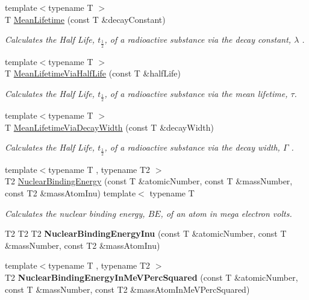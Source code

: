 \begin{DoxyCompactItemize}
{\footnotesize template$<$typename T $>$ }\\T \hyperlink{group___atomic_gaa9e3c2deedda4bc7a745568b06fc47eb}{Mean\+Lifetime} (const T \&decay\+Constant)
\begin{DoxyCompactList}\small\item\em Calculates the Half Life, $t_{\frac{1}{2}}$, of a radioactive substance via the decay constant, $\lambda$ . \end{DoxyCompactList}\item 
{\footnotesize template$<$typename T $>$ }\\T \hyperlink{group___atomic_ga2586e148263e1f6c8ff89f269a0930ea}{Mean\+Lifetime\+Via\+Half\+Life} (const T \&half\+Life)
\begin{DoxyCompactList}\small\item\em Calculates the Half Life, $t_{\frac{1}{2}}$, of a radioactive substance via the mean lifetime, $\tau$. \end{DoxyCompactList}\item 
{\footnotesize template$<$typename T $>$ }\\T \hyperlink{group___atomic_ga8a1dda4168b4b25db93bf1ae7832fd7e}{Mean\+Lifetime\+Via\+Decay\+Width} (const T \&decay\+Width)
\begin{DoxyCompactList}\small\item\em Calculates the Half Life, $t_{\frac{1}{2}}$, of a radioactive substance via the decay width, $\Gamma$ . \end{DoxyCompactList}\item 
{\footnotesize template$<$typename T , typename T2 $>$ }\\T2 \hyperlink{group___nuclear_binding_energy_gafea41a3c21704414394c3204b35aba98}{Nuclear\+Binding\+Energy} (const T \&atomic\+Number, const T \&mass\+Number, const T2 \&mass\+Atom\+Inu) template$<$ typename T
\begin{DoxyCompactList}\small\item\em Calculates the nuclear binding energy, $BE$, of an atom in mega electron volts. \end{DoxyCompactList}\item 
T2 T2 T2 {\bfseries Nuclear\+Binding\+Energy\+Inu} (const T \&atomic\+Number, const T \&mass\+Number, const T2 \&mass\+Atom\+Inu)
\item 
{\footnotesize template$<$typename T , typename T2 $>$ }\\T2 {\bfseries Nuclear\+Binding\+Energy\+In\+Me\+V\+Perc\+Squared} (const T \&atomic\+Number, const T \&mass\+Number, const T2 \&mass\+Atom\+In\+Me\+V\+Perc\+Squared)

\end{DoxyCompactItemize}
